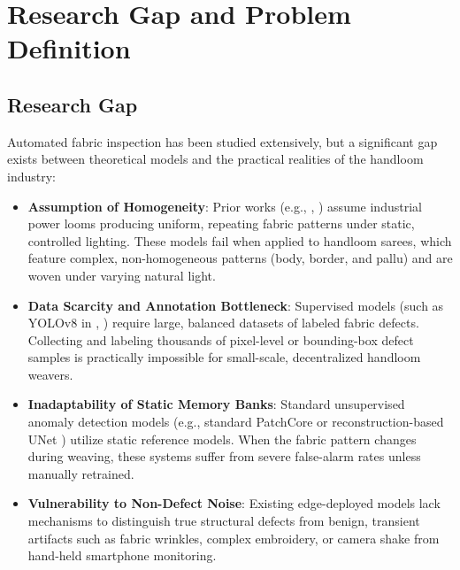 \documentclass{ieeeaccess}
\begin{document}
\section{Research Gap and Problem Definition}

\subsection{Research Gap}
Automated fabric inspection has been studied extensively, but a significant gap exists between theoretical models and the practical realities of the handloom industry:
\begin{itemize}
    \item \textbf{Assumption of Homogeneity}: Prior works (e.g., \cite{b1}, \cite{b4}) assume industrial power looms producing uniform, repeating fabric patterns under static, controlled lighting. These models fail when applied to handloom sarees, which feature complex, non-homogeneous patterns (body, border, and pallu) and are woven under varying natural light.
    \item \textbf{Data Scarcity and Annotation Bottleneck}: Supervised models (such as YOLOv8 in \cite{b4}, \cite{b5}) require large, balanced datasets of labeled fabric defects. Collecting and labeling thousands of pixel-level or bounding-box defect samples is practically impossible for small-scale, decentralized handloom weavers.
    \item \textbf{Inadaptability of Static Memory Banks}: Standard unsupervised anomaly detection models (e.g., standard PatchCore \cite{b13} or reconstruction-based UNet \cite{b12}) utilize static reference models. When the fabric pattern changes during weaving, these systems suffer from severe false-alarm rates unless manually retrained.
    \item \textbf{Vulnerability to Non-Defect Noise}: Existing edge-deployed models lack mechanisms to distinguish true structural defects from benign, transient artifacts such as fabric wrinkles, complex embroidery, or camera shake from hand-held smartphone monitoring.
\end{itemize}
\end{document}
